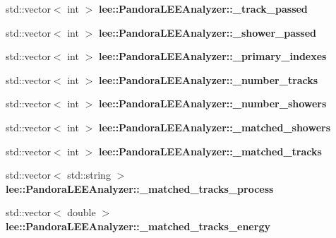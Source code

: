 \begin{DoxyCompactItemize}
\item 
\hypertarget{group__lee_ga222f64bba75838505ac948638260ed6b}{std\-::vector$<$ int $>$ {\bfseries lee\-::\-Pandora\-L\-E\-E\-Analyzer\-::\-\_\-track\-\_\-passed}}\label{group__lee_ga222f64bba75838505ac948638260ed6b}

\item 
\hypertarget{group__lee_ga677892512d8f61dd3783e04b2522925f}{std\-::vector$<$ int $>$ {\bfseries lee\-::\-Pandora\-L\-E\-E\-Analyzer\-::\-\_\-shower\-\_\-passed}}\label{group__lee_ga677892512d8f61dd3783e04b2522925f}

\item 
\hypertarget{group__lee_ga3020305a22a83591e103b8124140cea6}{std\-::vector$<$ int $>$ {\bfseries lee\-::\-Pandora\-L\-E\-E\-Analyzer\-::\-\_\-primary\-\_\-indexes}}\label{group__lee_ga3020305a22a83591e103b8124140cea6}

\item 
\hypertarget{group__lee_ga413d54bca989124f2aaec5837c930a22}{std\-::vector$<$ int $>$ {\bfseries lee\-::\-Pandora\-L\-E\-E\-Analyzer\-::\-\_\-number\-\_\-tracks}}\label{group__lee_ga413d54bca989124f2aaec5837c930a22}

\item 
\hypertarget{group__lee_ga636e7f5eece11bbd0d0188ea073c1ee5}{std\-::vector$<$ int $>$ {\bfseries lee\-::\-Pandora\-L\-E\-E\-Analyzer\-::\-\_\-number\-\_\-showers}}\label{group__lee_ga636e7f5eece11bbd0d0188ea073c1ee5}

\item 
\hypertarget{group__lee_ga51ecdfb466b876fde01072e95408bedb}{std\-::vector$<$ int $>$ {\bfseries lee\-::\-Pandora\-L\-E\-E\-Analyzer\-::\-\_\-matched\-\_\-showers}}\label{group__lee_ga51ecdfb466b876fde01072e95408bedb}

\item 
\hypertarget{group__lee_ga31e3e0db2ea3526c148ab1d98cd3b35c}{std\-::vector$<$ int $>$ {\bfseries lee\-::\-Pandora\-L\-E\-E\-Analyzer\-::\-\_\-matched\-\_\-tracks}}\label{group__lee_ga31e3e0db2ea3526c148ab1d98cd3b35c}

\item 
\hypertarget{group__lee_gaf01f5331ecedef37034b5e8a12aac314}{std\-::vector$<$ std\-::string $>$ {\bfseries lee\-::\-Pandora\-L\-E\-E\-Analyzer\-::\-\_\-matched\-\_\-tracks\-\_\-process}}\label{group__lee_gaf01f5331ecedef37034b5e8a12aac314}

\item 
\hypertarget{group__lee_ga3cd167b0e0e259df8c58bed1190edd85}{std\-::vector$<$ double $>$ {\bfseries lee\-::\-Pandora\-L\-E\-E\-Analyzer\-::\-\_\-matched\-\_\-tracks\-\_\-energy}}\label{group__lee_ga3cd167b0e0e259df8c58bed1190edd85}


\end{DoxyCompactItemize}

